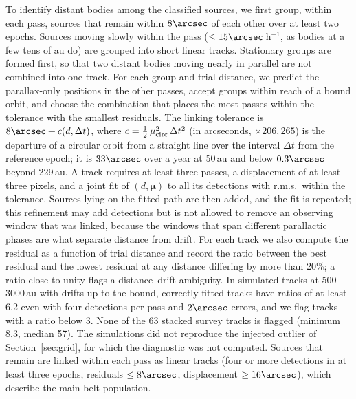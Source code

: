 \documentclass[twocolumn,linenumbers,anonymous]{aastex702}
\begin{document}
To identify distant bodies among the classified sources, we first group, within each pass, sources that remain within $8\arcsec$ of each other over at least two epochs. Sources moving slowly within the pass ($\le 15\arcsec$\,h$^{-1}$, as bodies at a few tens of au do) are grouped into short linear tracks. Stationary groups are formed first, so that two distant bodies moving nearly in parallel are not combined into one track. For each group and trial distance, we predict the parallax-only positions in the other passes, accept groups within reach of a bound orbit, and choose the combination that places the most passes within the tolerance with the smallest residuals. The linking tolerance is $8\arcsec + c(d, \Delta t)$, where $c = \frac{1}{2}\,\mu_{\rm circ}^2\,\Delta t^2$ (in arcseconds, $\times 206{,}265$) is the departure of a circular orbit from a straight line over the interval $\Delta t$ from the reference epoch; it is $33\arcsec$ over a year at 50\,au and below $0.3\arcsec$ beyond 229\,au. A track requires at least three passes, a displacement of at least three pixels, and a joint fit of $(d, \boldsymbol{\mu})$ to all its detections with r.m.s.\ within the tolerance. Sources lying on the fitted path are then added, and the fit is repeated; this refinement may add detections but is not allowed to remove an observing window that was linked, because the windows that span different parallactic phases are what separate distance from drift. For each track we also compute the residual as a function of trial distance and record the ratio between the best residual and the lowest residual at any distance differing by more than 20\%; a ratio close to unity flags a distance--drift ambiguity. In simulated tracks at 500--3000\,au with drifts up to the bound, correctly fitted tracks have ratios of at least 6.2 even with four detections per pass and $2\arcsec$ errors, and we flag tracks with a ratio below 3. None of the 63 stacked survey tracks is flagged (minimum 8.3, median 57). The simulations did not reproduce the injected outlier of Section~\ref{sec:grid}, for which the diagnostic was not computed. Sources that remain are linked within each pass as linear tracks (four or more detections in at least three epochs, residuals $\le 8\arcsec$, displacement $\ge 16\arcsec$), which describe the main-belt population.
\end{document}
